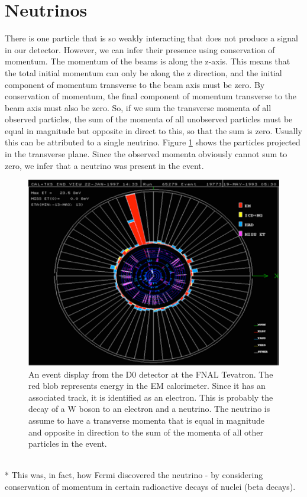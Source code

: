 \section{Neutrinos}
There is one particle that is so weakly interacting that does not produce a signal in our detector. However, we can infer their presence using conservation of momentum. The momentum of the beams is along the z-axis. This means that the total initial momentum can only be along the z direction, and the initial component of momentum transverse to the beam axis must be zero. By conservation of momentum, the final component of momentum transverse to the beam axis must also be zero.  So, if we sum the transverse momenta of all observed particles, the sum of the momenta of all unobserved particles must be equal in magnitude but opposite in direct to this, so that the sum is zero.  Usually this can be attributed to a single neutrino. Figure \ref{fig:pid4} shows the particles projected in the transverse plane. Since the observed momenta obviously cannot sum to zero, we infer that a neutrino was present in the event.
\begin{figure}[h]
\centering\includegraphics[scale=0.4]{./particleID/Pictures/fig4.pdf}
\caption{\small An event display from the D0 detector at the FNAL Tevatron.  The red blob represents energy in the EM calorimeter.  Since it has an associated track, it is identified as an electron. This is probably the decay of a W boson to an electron and a neutrino. The neutrino is assume to have a transverse momenta that is equal in magnitude and opposite in direction to the sum of the momenta of all other particles in the event.}
\label{fig:pid4}
\end{figure}
\\*
This was, in fact, how Fermi discovered the neutrino - by considering conservation of momentum in certain radioactive decays of nuclei (beta decays). 

